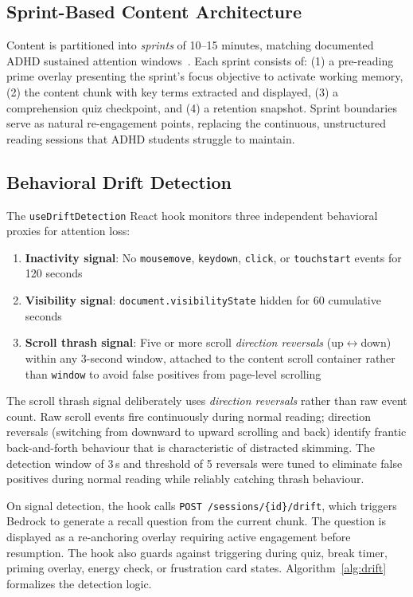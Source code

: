 \documentclass[conference]{IEEEtran}
\begin{document}
\subsection{Sprint-Based Content Architecture}

Content is partitioned into \textit{sprints} of 10--15 minutes, matching documented ADHD sustained attention windows~\cite{faraone2015attention}. Each sprint consists of: (1) a pre-reading prime overlay presenting the sprint's focus objective to activate working memory, (2) the content chunk with key terms extracted and displayed, (3) a comprehension quiz checkpoint, and (4) a retention snapshot. Sprint boundaries serve as natural re-engagement points, replacing the continuous, unstructured reading sessions that ADHD students struggle to maintain.

\subsection{Behavioral Drift Detection}

The \texttt{useDriftDetection} React hook monitors three independent behavioral proxies for attention loss:

\begin{enumerate}
  \item \textbf{Inactivity signal}: No \texttt{mousemove}, \texttt{keydown}, \texttt{click}, or \texttt{touchstart} events for 120 seconds
  \item \textbf{Visibility signal}: \texttt{document.visibilityState} hidden for 60 cumulative seconds
  \item \textbf{Scroll thrash signal}: Five or more scroll \emph{direction reversals} (up$\leftrightarrow$down) within any 3-second window, attached to the content scroll container rather than \texttt{window} to avoid false positives from page-level scrolling
\end{enumerate}

The scroll thrash signal deliberately uses \emph{direction reversals} rather than raw event count. Raw scroll events fire continuously during normal reading; direction reversals (switching from downward to upward scrolling and back) identify frantic back-and-forth behaviour that is characteristic of distracted skimming. The detection window of 3\,s and threshold of 5 reversals were tuned to eliminate false positives during normal reading while reliably catching thrash behaviour.

On signal detection, the hook calls \texttt{POST /sessions/\{id\}/drift}, which triggers Bedrock to generate a recall question from the current chunk. The question is displayed as a re-anchoring overlay requiring active engagement before resumption. The hook also guards against triggering during quiz, break timer, priming overlay, energy check, or frustration card states. Algorithm~\ref{alg:drift} formalizes the detection logic.
\end{document}
